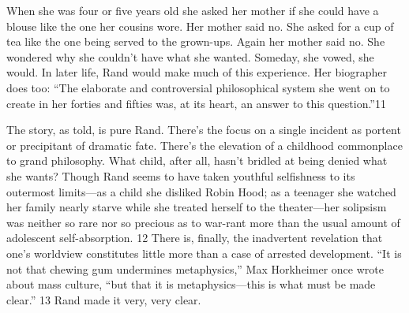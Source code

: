  \par 
When she was four or five years old she asked her mother if she could have a blouse like the one her cousins wore. Her mother said no. She asked for a cup of tea like the one being served to the grown-ups. Again her mother said no. She wondered why she couldn’t have what she wanted. Someday, she vowed, she would. In later life, Rand would make much of this experience. Her biographer does too: “The elaborate and controversial philosophical system she went on to create in her forties and fifties was, at its heart, an answer to this question.”{\color{blue}11}
 \par 
The story, as told, is pure Rand. There’s the focus on a single incident as portent or precipitant of dramatic fate. There’s the elevation of a childhood commonplace to grand philosophy. What child, after all, hasn’t bridled at being denied what she wants? Though Rand seems to have taken youthful selfishness to its outermost limits—as a child she disliked Robin Hood; as a teenager she watched her family nearly starve while she treated herself to the theater—her solipsism was neither so rare nor so precious as to war-rant more than the usual amount of adolescent self-absorption. {\color{blue}12} There is, finally, the inadvertent revelation that one’s worldview constitutes little more than a case of arrested development. “It is not that chewing gum undermines metaphysics,” Max Horkheimer once wrote about mass culture, “but that it is metaphysics—this is what must be made clear.” {\color{blue}13} Rand made it very, very clear.
 \par 
